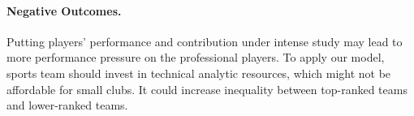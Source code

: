 \documentclass[letterpaper]{article} %
\begin{document}
\paragraph{Negative Outcomes.} Putting players' performance and contribution under intense study may lead to more performance pressure on the professional players. To apply our model, sports team should invest in technical analytic resources, which might not be affordable for small clubs. It could increase inequality between top-ranked teams and lower-ranked teams. 





\end{document}
